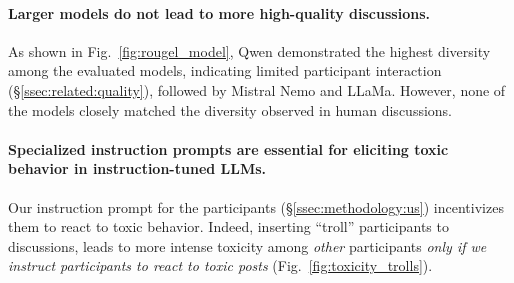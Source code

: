 \paragraph{Larger models do not lead to more high-quality discussions.} As shown in Fig.~\ref{fig:rougel_model}, Qwen demonstrated the highest diversity among the evaluated models, indicating limited participant interaction (\S\ref{ssec:related:quality}), followed by Mistral Nemo and LLaMa. However, none of the models closely matched the diversity observed in human discussions. 

\paragraph{Specialized instruction prompts are essential for eliciting toxic behavior in instruction-tuned LLMs.} Our instruction prompt for the participants (\S\ref{ssec:methodology:us}) incentivizes them to react to toxic behavior. Indeed, inserting “troll” participants to discussions, leads to more intense toxicity among \emph{other} participants \emph{only if we instruct participants to react to toxic posts} (Fig.~\ref{fig:toxicity_trolls}). 

